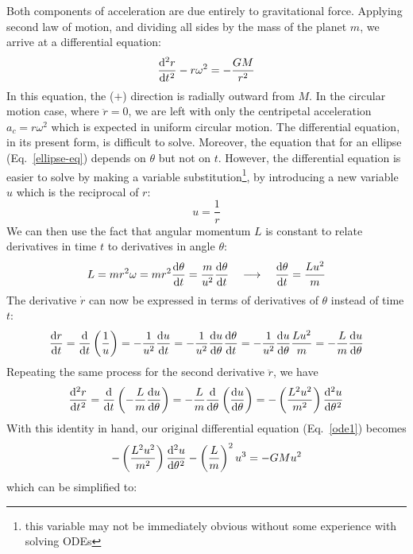 \documentclass{../../oss-handout}
\begin{document}
Both components of acceleration are due entirely to gravitational force.
Applying second law of motion, and dividing all sides by the mass of the planet
$m$, we arrive at a differential equation:
\begin{equation}
  \diff[2]rt-r\omega^2=-\frac{GM}{r^2}
  \label{ode1}
\end{equation}
In this equation, the ($+$) direction is radially outward from $M$. In the
circular motion case, where $\ddot r=0$, we are left with only the centripetal
acceleration $a_c=r\omega^2$ which is expected in uniform circular motion. The
differential equation, in its present form, is difficult to solve. Moreover,
the equation that for an ellipse (Eq.~\ref{ellipse-eq}) depends on $\theta$ but
not on $t$. However, the differential equation is easier to solve by making a
variable substitution\footnote{this variable may not be immediately obvious
  without some experience with solving ODEs}, by introducing a new variable $u$
which is the reciprocal of $r$:
\begin{equation}
  u=\frac1r
\end{equation}
We can then use the fact that angular momentum $L$ is constant to relate
derivatives in time $t$ to derivatives in angle $\theta$:
\begin{equation}
  L=mr^2\omega=mr^2\diff{\theta}t=\frac m{u^2}\diff{\theta}t
  \quad\longrightarrow\quad
  \diff{\theta}t=\frac{Lu^2}m
\end{equation}
The derivative $\dot r$ can now be expressed in terms of derivatives of
$\theta$ instead of time $t$:
\begin{equation}
  \diff rt =\diff*{\left(\frac1u\right)}t
  =-\frac1{u^2}\diff ut=-\frac1{u^2}\diff u\theta\diff{\theta}t
  = -\frac1{u^2}\diff u\theta \frac{Lu^2}m
  = -\frac Lm\diff u\theta
\end{equation}
Repeating the same process for the second derivative $\ddot{r}$, we have
\begin{equation}
  \diff[2] rt = \diff*{\left(-\frac Lm\diff u\theta\right)}t
  = -\frac Lm\diff*{\left(\diff u\theta\right)}\theta \\
  = -\left(\frac{L^2u^2}{m^2}\right)\diff[2]u\theta
\end{equation}
With this identity in hand, our original differential equation
(Eq.~\ref{ode1}) becomes
\begin{equation}
  -\left(\frac{L^2u^2}{m^2}\right)\diff[2]u\theta-\left(\frac{L}{m}\right)^2u^3
  = -GMu^2
\end{equation}
which can be simplified to:
\end{document}
